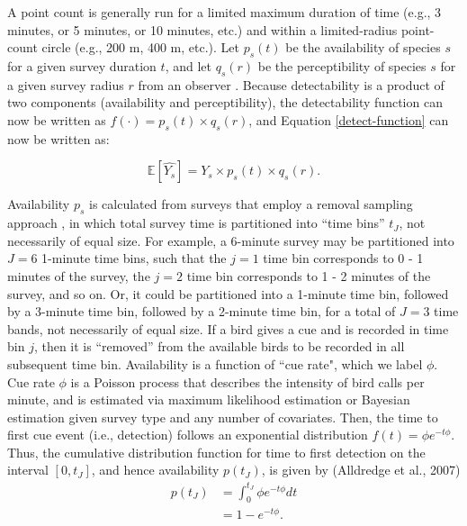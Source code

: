 \par A point count is generally run for a limited maximum duration of time (e.g., 3 minutes, or 5 minutes, or 10 minutes, etc.) and within a limited-radius point-count circle (e.g., 200 m, 400 m, etc.).
Let $p_s(t)$ be the availability of species $s$ for a given survey duration $t$, and let $q_s(r)$ be the perceptibility of species $s$ for a given survey radius $r$ from an observer \citep{solymos_calibrating_2013}. 
Because detectability is a product of two components (availability and perceptibility), the detectability function can now be written as $f(\cdot) = p_s(t) \times q_s(r)$, and Equation \ref{detect-function} can now be written as:

\begin{equation*}
	\mathbb{E}\left[\hat{Y_s}\right] = Y_s \times p_s(t) \times q_s(r).
\end{equation*}

\par Availability $p_s$ is calculated from surveys that employ a removal sampling approach \citep{alldredge_time--detection_2007, farnsworth_removal_2002, solymos_evaluating_2018}, in which total survey time is partitioned into “time bins” $t_J$, not necessarily of equal size. 
For example, a 6-minute survey may be partitioned into $J = 6$ 1-minute time bins, such that the $j = 1$ time bin corresponds to 0 - 1 minutes of the survey, the $j = 2$ time bin corresponds to 1 - 2 minutes of the survey, and so on.
Or, it could be partitioned into a 1-minute time bin, followed by a 3-minute time bin, followed by a 2-minute time bin, for a total of $J = 3$ time bands, not necessarily of equal size. 
If a bird gives a cue and is recorded in time bin $j$, then it is ``removed” from the available birds to be recorded in all subsequent time bin. 
Availability is a function of ``cue rate", which we label $\phi$.
Cue rate $\phi$ is a Poisson process that describes the intensity of bird calls per minute, and is estimated via maximum likelihood estimation or Bayesian estimation given survey type and any number of covariates. 
Then, the time to first cue event (i.e., detection) follows an exponential distribution $f(t) = \phi e^{-t\phi}$. 
Thus, the cumulative distribution function for time to first detection on the interval $\left[0, t_J\right]$, and hence availability $p(t_J)$, is given by (Alldredge et al., 2007)
\begin{align*}
	p(t_J) &= \int_{0}^{t_J} \phi e^{-t\phi} dt \\
	&= 1 - e^{-t\phi}.
\end{align*}

